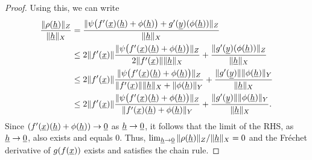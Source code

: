 \begin{proof}
Using this, we can write
\begin{align*}
\frac{\|\rho(\underline{h})\|_Z}{\|\underline{h}\|_X}
&= \frac{\| \psi \big(f'(\underline{x})(\underline{h}) + \phi(\underline{h}) \big) + g'(\underline{y})(\phi(\underline{h})) \|_Z}{\|\underline{h}\|_X} \\
&\leq 2 \|f'(\underline{x})\|  \frac{\| \psi \big(f'(\underline{x})(\underline{h}) + \phi(\underline{h}) \big) \|_Z}{ 2 \|f'(\underline{x})\|  \|\underline{h}\|_X} + \frac{\|  g'(\underline{y})(\phi(\underline{h})) \|_Z}{\|\underline{h}\|_X} \\
& \leq 2 \|f'(\underline{x})\| \frac{\| \psi \big(f'(\underline{x})(\underline{h}) + \phi(\underline{h}) \big) \|_Z}{\|f'(\underline{x})\| \|\underline{h}\|_X + \| \phi(\underline{h}) \|_Y} + \frac{\|  g'(\underline{y})\| \|\phi(\underline{h}) \|_Y}{\|\underline{h}\|_X} \\
& \leq 2 \|f'(\underline{x})\| \frac{\| \psi \big(f'(\underline{x})(\underline{h}) + \phi(\underline{h}) \big) \|_Z}{\|f'(\underline{x}) (\underline{h}) + \phi(\underline{h})\|_Y} + \frac{\|  g'(\underline{y})\| \|\phi(\underline{h}) \|_Y}{\|\underline{h}\|_X}.
\end{align*}
Since $(f'(\underline{x}) (\underline{h}) + \phi(\underline{h})) \to \underline{0}$ as $\underline{h}\to\underline{0}$, it follows that the limit of the RHS, as $\underline{h}\to\underline{0}$, also exists and equals 0.
Thus, $\lim_{\underline{h} \to \underline{0}} \| \rho (\underline{h}) \|_Z / \|\underline{h}\|_X = 0$ and the Fr\'{e}chet derivative of $g(f(\underline{x}))$ exists and satisfies the chain rule.
\end{proof}

